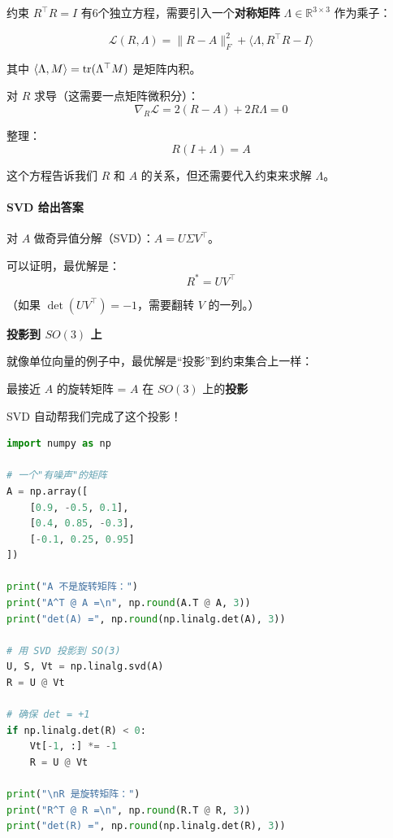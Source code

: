 约束 $R^\top R = I$ 有6个独立方程，需要引入一个\textbf{对称矩阵} $\Lambda \in \mathbb{R}^{3 \times 3}$ 作为乘子：

\begin{equation}
\mathcal{L}(R, \Lambda) = \|R - A\|_F^2 + \langle \Lambda, R^\top R - I \rangle
\end{equation}

其中 $\langle \Lambda, M \rangle = \text{tr}(\Lambda^\top M)$ 是矩阵内积。

对 $R$ 求导（这需要一点矩阵微积分）：
\begin{equation}
\nabla_R \mathcal{L} = 2(R - A) + 2R\Lambda = 0
\end{equation}

整理：
\begin{equation}
R(I + \Lambda) = A
\end{equation}

这个方程告诉我们 $R$ 和 $A$ 的关系，但还需要代入约束来求解 $\Lambda$。

\paragraph{SVD 给出答案}

对 $A$ 做奇异值分解（SVD）：$A = U \Sigma V^\top$。

可以证明，最优解是：
\begin{equation}
R^* = U V^\top
\end{equation}

（如果 $\det(UV^\top) = -1$，需要翻转 $V$ 的一列。）

\begin{physicalmeaning}
\textbf{投影到 $SO(3)$ 上}

就像单位向量的例子中，最优解是“投影”到约束集合上一样：

最接近 $A$ 的旋转矩阵 = $A$ 在 $SO(3)$ 上的\textbf{投影}

SVD 自动帮我们完成了这个投影！
\end{physicalmeaning}

\begin{lstlisting}[style=teaching, language=Python]
import numpy as np

# 一个"有噪声"的矩阵
A = np.array([
    [0.9, -0.5, 0.1],
    [0.4, 0.85, -0.3],
    [-0.1, 0.25, 0.95]
])

print("A 不是旋转矩阵：")
print("A^T @ A =\n", np.round(A.T @ A, 3))
print("det(A) =", np.round(np.linalg.det(A), 3))

# 用 SVD 投影到 SO(3)
U, S, Vt = np.linalg.svd(A)
R = U @ Vt

# 确保 det = +1
if np.linalg.det(R) < 0:
    Vt[-1, :] *= -1
    R = U @ Vt

print("\nR 是旋转矩阵：")
print("R^T @ R =\n", np.round(R.T @ R, 3))
print("det(R) =", np.round(np.linalg.det(R), 3))
\end{lstlisting}

